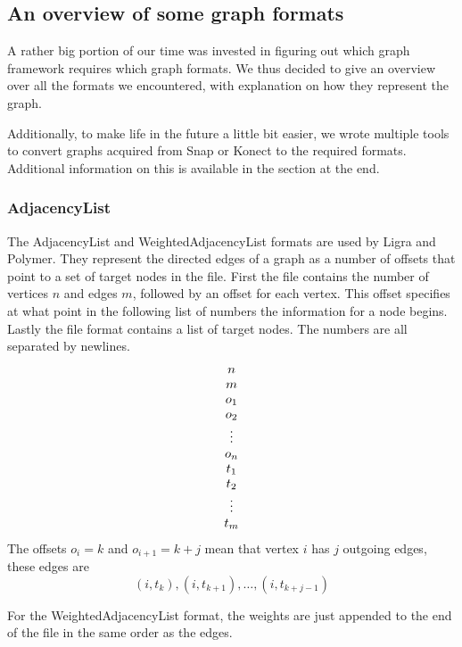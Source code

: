 
\subsection{An overview of some graph formats}
A rather big portion of our time was invested in figuring out which graph framework requires which graph formats. We thus decided to give an overview over all the formats we encountered, with explanation on how they represent the graph.

Additionally, to make life in the future a little bit easier, we wrote multiple tools to convert graphs acquired from Snap or Konect to the required formats. Additional information on this is available in the section  at the end.

\subsubsection{AdjacencyList}
The AdjacencyList and WeightedAdjacencyList formats\cite{adjListFormat} are used by Ligra and Polymer. They represent the directed edges of a graph as a number of offsets that point to a set of target nodes in the file.
First the file contains the number of vertices $n$ and edges $m$, followed by an offset for each vertex. This offset specifies at what point in the following list of numbers the information for a node begins.
Lastly the file format contains a list of target nodes.
The numbers are all separated by newlines.
\begin{gather*}%
n\\[-1\jot]
m\\[-1\jot]
o_1\\[-1\jot]
o_2\\[-1\jot]
\vdots\\[-1\jot]
o_n\\[-1\jot]
t_1\\[-1\jot]
t_2\\[-1\jot]
\vdots\\[-1\jot]
t_m
\end{gather*}
The offsets $o_i=k$ and $o_{i+1}=k+j$ mean that vertex $i$ has $j$ outgoing edges, these edges are
\begin{equation*}
	(i,t_k),(i,t_{k+1}),\ldots,(i,t_{k+j-1})
\end{equation*}

For the WeightedAdjacencyList format, the weights are just appended to the end of the file in the same order as the edges.


